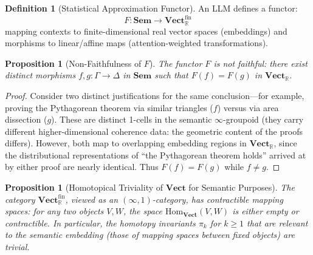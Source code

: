 \documentclass[11pt,a4paper]{article}
\theoremstyle{plain}
\newtheorem{proposition}[theorem]{Proposition}
\theoremstyle{definition}
\newtheorem{definition}[theorem]{Definition}
\theoremstyle{remark}
\newcommand{\Sem}{\mathbf{Sem}}
\newcommand{\Vect}{\mathbf{Vect}}
\newcommand{\Hom}{\mathrm{Hom}}
\newcommand{\R}{\mathbb{R}}
\begin{document}
\begin{definition}[Statistical Approximation Functor]
\label{def:functor-F}
An LLM defines a functor:
\[
F: \Sem \to \Vect_{\R}^{\mathrm{fin}}
\]
mapping contexts to finite-dimensional real vector spaces (embeddings) and morphisms to linear/affine maps (attention-weighted transformations).
\end{definition}

\begin{proposition}[Non-Faithfulness of $F$]
\label{prop:non-faithful}
The functor $F$ is not faithful: there exist distinct morphisms $f, g: \Gamma \to \Delta$ in $\Sem$ such that $F(f) = F(g)$ in $\Vect_{\R}$.
\end{proposition}

\begin{proof}
Consider two distinct justifications for the same conclusion---for example, proving the Pythagorean theorem via similar triangles ($f$) versus via area dissection ($g$). These are distinct 1-cells in the semantic $\infty$-groupoid (they carry different higher-dimensional coherence data: the geometric content of the proofs differs). However, both map to overlapping embedding regions in $\Vect_{\R}$, since the distributional representations of ``the Pythagorean theorem holds'' arrived at by either proof are nearly identical. Thus $F(f) = F(g)$ while $f \neq g$.
\end{proof}

\begin{proposition}[Homotopical Triviality of $\Vect$ for Semantic Purposes]
\label{prop:contractible}
The category $\Vect_{\R}^{\mathrm{fin}}$, viewed as an $(\infty,1)$-category, has contractible mapping spaces: for any two objects $V, W$, the space $\Hom_{\Vect}(V, W)$ is either empty or contractible. In particular, the homotopy invariants $\pi_k$ for $k \geq 1$ that are relevant to the semantic embedding (those of mapping spaces between fixed objects) are trivial.
\end{proposition}
\end{document}

